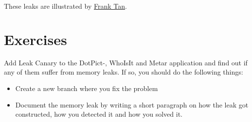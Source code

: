 These leaks are illustrated by \href{https://github.com/frank-tan/SinsOfMemoryLeaks}{Frank Tan}.

\newpage
\section{Exercises}
\begin{exercise}
	Add Leak Canary to the DotPict-, WhoIsIt and Metar application and find out if any of them suffer from memory leaks. If so, you should do the following things:
	\begin{itemize}
		\item Create a new branch where you fix the problem
		\item Document the memory leak by writing a short paragraph on how the leak got constructed, how you detected it and how you solved it. 
	\end{itemize}
	
\end{exercise}
